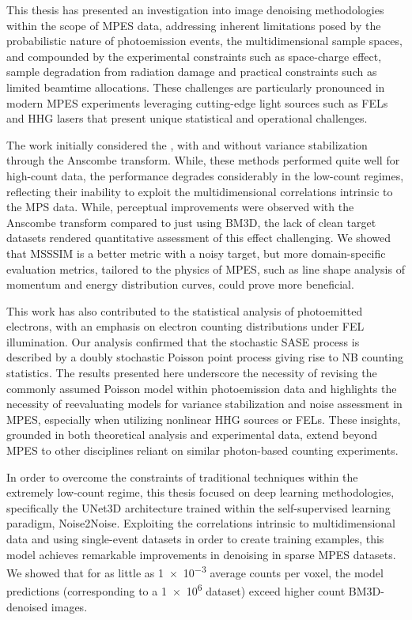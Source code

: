 This thesis has presented an investigation into image denoising methodologies within the scope of \gls{MPES} data, addressing inherent limitations posed by the probabilistic nature of photoemission events, the multidimensional sample spaces, and compounded by the experimental constraints such as space-charge effect, sample degradation from radiation damage and practical constraints such as limited  beamtime allocations. These challenges are particularly pronounced in modern \gls{MPES} experiments leveraging cutting-edge light sources such as \glspl{FEL} and \gls{HHG} lasers that present unique statistical and operational challenges.

The work initially considered the , with and without variance stabilization through the Anscombe transform. While, these methods performed quite well for high-count data, the performance degrades considerably in the low-count regimes, reflecting their inability to exploit the multidimensional correlations intrinsic to the MPS data. While, perceptual improvements were observed with the Anscombe transform compared to just using \gls{BM3D}, the lack of clean target datasets rendered quantitative assessment of this effect challenging. We showed that \gls{MSSSIM} is a better metric with a noisy target, but more domain-specific evaluation metrics, tailored to the physics of \gls{MPES}, such as line shape analysis of momentum and energy distribution curves, could prove more beneficial.

This work has also contributed to the statistical analysis of photoemitted electrons, with an emphasis on electron counting distributions under FEL illumination. Our analysis confirmed that the stochastic SASE process is described by a doubly stochastic Poisson point process giving rise to NB counting statistics. The results presented here underscore the necessity of revising the commonly assumed Poisson model  within photoemission data and highlights the necessity of reevaluating models for variance stabilization and noise assessment in \gls{MPES}, especially when utilizing nonlinear \gls{HHG} sources or \glspl{FEL}. These insights, grounded in both theoretical analysis and experimental data, extend beyond \gls{MPES} to other disciplines reliant on similar photon-based counting experiments. 

In order to overcome the constraints of traditional techniques within the extremely low-count regime, this thesis focused on deep learning methodologies, specifically the UNet3D architecture trained within the self-supervised learning paradigm, Noise2Noise. Exploiting the  correlations intrinsic to multidimensional data and using single-event datasets in order to create training examples, this model achieves  remarkable improvements in denoising in sparse \gls{MPES} datasets. We showed that for as little as \num{1e-3} average counts per voxel, the model predictions (corresponding to a \num{1e6} dataset) exceed higher count \gls{BM3D}-denoised images.

